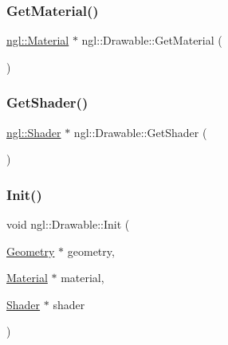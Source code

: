 \mbox{\label{classngl_1_1_drawable_af24fe0143a14c1ee5e1920b2d2795406}} 
\subsubsection{\texorpdfstring{Get\+Material()}{GetMaterial()}}
{\footnotesize\ttfamily \mbox{\hyperlink{classngl_1_1_material}{ngl\+::\+Material}} $\ast$ ngl\+::\+Drawable\+::\+Get\+Material (\begin{DoxyParamCaption}{ }\end{DoxyParamCaption})}

\mbox{\label{classngl_1_1_drawable_a81edf65e62d4405757981d12ad05a4ae}} 
\subsubsection{\texorpdfstring{Get\+Shader()}{GetShader()}}
{\footnotesize\ttfamily \mbox{\hyperlink{classngl_1_1_shader}{ngl\+::\+Shader}} $\ast$ ngl\+::\+Drawable\+::\+Get\+Shader (\begin{DoxyParamCaption}{ }\end{DoxyParamCaption})}

\mbox{\label{classngl_1_1_drawable_a8e19b42f9c9e8ebab1e6781dea3fdd34}} 
\subsubsection{\texorpdfstring{Init()}{Init()}}
{\footnotesize\ttfamily void ngl\+::\+Drawable\+::\+Init (\begin{DoxyParamCaption}\item[{\mbox{\hyperlink{classngl_1_1_geometry}{Geometry}} $\ast$}]{geometry,  }\item[{\mbox{\hyperlink{classngl_1_1_material}{Material}} $\ast$}]{material,  }\item[{\mbox{\hyperlink{classngl_1_1_shader}{Shader}} $\ast$}]{shader }\end{DoxyParamCaption})}

